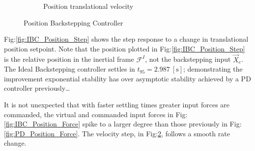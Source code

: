 \begin{figure}[hbtp]
\begin{subfigure}{0.49\textwidth}
\caption{Position translational velocity}
\label{fig:IBC_Position_Velocity}
\end{subfigure}
\vspace{-6pt}
\caption{Position Backstepping Controller}
\vspace{-8pt}
\end{figure}
\par
Fig:\ref{fig:IBC_Position_Step} shows the step response to a change in translational position setpoint. Note that the position plotted in Fig:\ref{fig:IBC_Position_Step} is the relative position in the inertial frame $\mathcal{F}^{I}$, not the backstepping input $\vec{X}_e$. The Ideal Backstepping controller settles in $t_{95}=2.987~[\text{s}]$; demonstrating the improvement exponential stability has over asymptotic stability achieved by a PD controller previously\ldots
\par
It is not unexpected that with faster settling times greater input forces are commanded, the virtual and commanded input forces in Fig:\ref{fig:IBC_Position_Force} spike to a larger degree than those previously in Fig:\ref{fig:PD_Position_Force}. The velocity step, in Fig:\ref{fig:IBC_Position_Velocity}, follows a smooth rate change.

